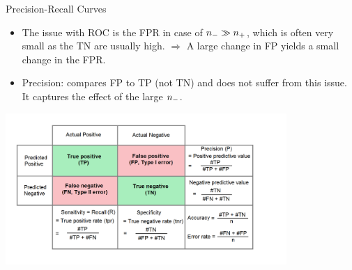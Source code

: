 \begin{vbframe}{Precision-Recall Curves}


\framebreak

\begin{itemize}
  \item The issue with ROC is the FPR in case of $n_{-} \gg n_{+}$, which is often 
  very small as the TN are usually high. \newline
  $\Rightarrow$ A large change in FP yields a small change in the FPR.
  \item Precision: compares FP to TP (not TN) and does not suffer from this 
  issue. It captures the effect of the large $n_{-}$.
\end{itemize}

\begin{center}
  \includegraphics[width=0.8\textwidth]{figure_man/roc-confusion_matrix.png}
\end{center}

\framebreak

\begin{footnotesize}


\end{footnotesize}
\end{vbframe}
